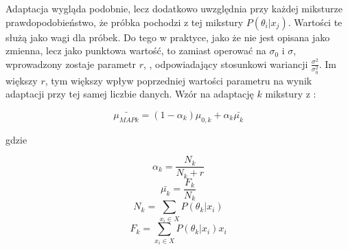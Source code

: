 Adaptacja  wygląda podobnie, lecz dodatkowo uwzględnia przy każdej miksturze prawdopodobieństwo,
że próbka pochodzi z tej mikstury $P(\theta_i | x_j)$. Wartości te służą jako wagi dla próbek. Do tego w
praktyce, jako że  nie jest opisana jako zmienna, lecz jako punktowa wartość, to zamiast
operować na $\sigma_0$ i $\sigma$, wprowadzony zostaje parametr $r$, , odpowiadający
stosunkowi wariancji $\frac{\sigma^2}{\sigma_0^2}$. Im większy $r$, tym większy wpływ poprzedniej wartości
parametru na wynik adaptacji przy tej samej liczbie danych. Wzór na adaptację $k$ mikstury z \cite{comparisonOfMultiple}:

$$\bar{\mu_{MAP k}} = (1 - \alpha_k) \mu_{0,k} + \alpha_k \bar{\mu_k}$$

gdzie

$$\alpha_k = \frac{N_k}{N_k + r}$$
$$\bar{\mu_k} = \frac{F_k}{N_k}$$
$$N_k = \sum_{x_i \in X} P(\theta_k | x_i)$$
$$F_k = \sum_{x_i \in X} P(\theta_k | x_i) x_i$$



%

%
%
%
%
%

